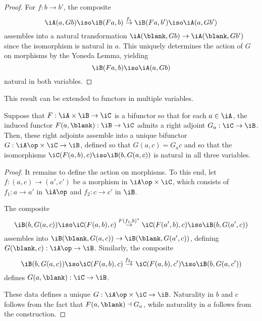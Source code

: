 \documentclass{amsart}
\begin{document}
\begin{proof}
  For $f : b \to b'$, the composite
  \[
    \iA(a, Gb) \iso \iB(Fa, b) \overset{f_{*}}{\to} \iB(Fa, b') \iso \iA(a, Gb')
  \]
  assembles into a natural transformation $\iA(\blank, Gb) \to \iA(\blank, Gb')$ since the isomorphism is natural in $a$.
  This uniquely determines the action of $G$ on morphisms by the Yoneda Lemma, yielding
  \[
    \iB(Fa, b) \iso \iA(a, Gb)
  \]
  natural in both variables.
\end{proof}

This result can be extended to functors in multiple variables.

\begin{lem}
  Suppose that $F : \iA \times \iB \to \iC$ is a bifunctor so that for each $a \in \iA$, the induced functor $F(a, \blank) : \iB \to \iC$ admits a right adjoint $G_{a} : \iC \to \iB$.
  Then, these right adjoints assemble into a unique bifunctor $G : \iA\op \times \iC \to \iB$, defined so that $G(a,c) = G_{a}c$ and so that the isomorphisms $\iC(F(a,b),c) \iso \iB(b, G(a,c))$ is natural in all three variables.
\end{lem}
\begin{proof}
  It remains to define the action on morphisms.
  To this end, let $f : (a, c) \to (a', c')$ be a morphism in $\iA\op \times \iC$, which consists of $f_{1} : a \to a'$ in $\iA\op$ and $f_{2} : c \to c'$ in $\iB$.

  The composite
  \[
    \iB(b, G(a,c)) \iso \iC(F(a,b),c) \overset{F(f_{1},b)^{*}}{\to} \iC(F(a',b),c) \iso \iB(b, G(a',c))
  \]
  assembles into $\iB(\blank, G(a,c)) \to \iB(\blank, G(a', c))$, defining $G(\blank, c) : \iA\op \to \iB$.
  Similarly, the composite
  \[
    \iB(b, G(a,c)) \iso \iC(F(a,b), c) \overset{f_{2_{*}}}{\to} \iC(F(a,b), c') \iso \iB(b, G(a,c'))
  \]
  defines $G(a, \blank) : \iC \to \iB$.

  These data defines a unique $G : \iA\op \times \iC \to \iB$.
  Naturality in $b$ and $c$ follows from the fact that $F(a, \blank) \dashv G_{a}$, while naturality in $a$ follows from the construction.
\end{proof}



\end{document}
